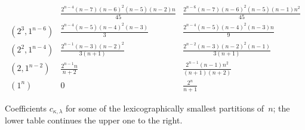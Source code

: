 \documentclass[10pt,oneside,american]{amsart}
\numberwithin{equation}{section}
\numberwithin{figure}{section}
\theoremstyle{definition}
\theoremstyle{remark}
\theoremstyle{plain}
\theoremstyle{definition}
\theoremstyle{plain}
\begin{document}
\begin{table}
\[\begin{array}{c|cc}
    & \frac{2^{n-4} (n-7) (n-6)^2 (n-5) (n-2) n}{45}
    & \frac{2^{n-6} (n-7) (n-6)^2 (n-5) (n-1) n^2}{45}
    \\[1ex]
    (2^3,1^{n-6})
    & \frac{2^{n-4} (n-5) (n-4)^2 (n-3)}{3}
    & \frac{2^{n-4} (n-5) (n-4)^2 (n-3) n}{9}
    \\[1ex]
    (2^2,1^{n-4})
    & \frac{2^{n-1} (n-3) (n-2)^2}{3 (n+1)}
    & \frac{2^{n-2} (n-3) (n-2)^2 (n-1)}{3 (n+1)}
    \\[1ex]
    (2,1^{n-2})
    & \frac{2^{n-1} n}{n+2}
    & \frac{2^{n-1} (n-1) n^2}{(n+1) (n+2)}
    \\[1ex]
    (1^n)
    & 0 & \frac{2^n}{n+1}
\end{array}
\]
\caption{Coefficients $c_{\kappa,\lambda}$ for some of the lexicographically
  smallest partitions of~$n$; the lower table continues the upper one to the
  right.}
\label{tab:cn2}
\end{table}
\end{document}
